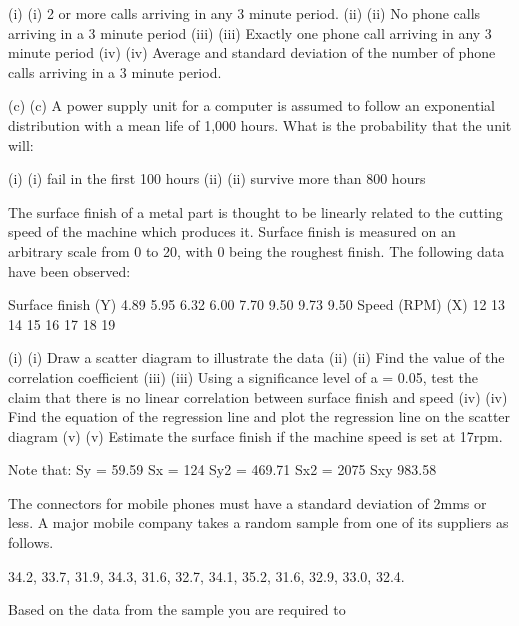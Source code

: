 (i)	(i)                  2 or more calls arriving in any 3 minute period.
(ii)	(ii)                No phone calls arriving in a 3 minute period
(iii)	(iii)               Exactly one phone call arriving in any 3 minute period
(iv)	(iv)              Average and standard deviation of the number of phone calls arriving in a 3 minute period.
 

(c)	(c)    A power supply unit for a computer is assumed to follow an exponential distribution with a mean life of 1,000 hours.  What is the probability that the unit will:
 
(i)	(i)                  fail in the first 100 hours
(ii)	(ii)                survive more than 800 hours
 
 
 

The surface finish of a metal part is thought to be linearly related to the cutting speed of the machine which produces it.  Surface finish is measured on an arbitrary scale from 0 to 20, with 0 being the roughest finish.  The following data have been observed:
 
Surface finish (Y)	4.89	5.95	6.32	6.00	7.70	9.50	9.73	9.50
Speed (RPM) (X)	12	13	14	15	16	17	18	19
 
(i)	(i)                  Draw a scatter diagram to illustrate the data
(ii)	(ii)                Find the value of the correlation coefficient
(iii)	(iii)               Using a significance level of a = 0.05, test the claim that there is no linear correlation between surface finish and speed
(iv)	(iv)              Find the equation of the regression line and plot the regression line on the scatter diagram
(v)	(v)                Estimate the surface finish if the machine speed is set at 17rpm. 
 
 
Note that:
Sy = 	59.59
Sx = 	124
Sy2 = 	469.71
Sx2 = 	2075
Sxy	983.58

 
The connectors for mobile phones must have a standard deviation of 2mms or less.  A major mobile company takes a random sample from one of its suppliers as follows.
 
34.2, 33.7, 31.9, 34.3, 31.6, 32.7, 34.1, 35.2, 31.6, 32.9, 33.0, 32.4.
 
Based on the data from the sample you are required to 
 
